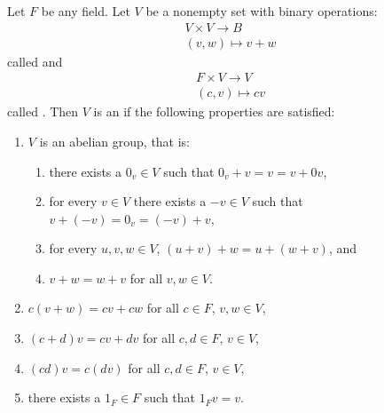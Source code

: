     \begin{definition}
        Let $F$ be any field. Let $V$ be a nonempty set with binary operations:
            \begin{equation*}
            \begin{split}
                V \times V \rightarrow B \\
                (v,w) \mapsto v+w
            \end{split}
            \end{equation*}
        called  and
            \begin{equation*}
            \begin{split}
                F \times V \rightarrow V \\
                (c,v) \mapsto cv
            \end{split}
            \end{equation*}
        called . Then $V$ is an  if the following properties are satisfied:
            \begin{enumerate}[label = (\arabic*)]
                \item $V$ is an abelian group, that is:
                    \begin{enumerate}[label = (\roman*)]
                        \item there exists a $0_v \in V$ such that $0_v + v = v = v + 0v$,
                        \item for every $v \in V$ there exists a $-v \in V$ such that $v+(-v) = 0_v = (-v) + v$,
                        \item for every $u,v,w \in V$, $(u+v) + w = u + (w+v)$, and
                        \item $v + w = w+ v$ for all $v,w \in V$. 
                    \end{enumerate}
                \item $c(v+w) = cv + cw$ for all $c \in F$, $v,w \in V$,
                \item $(c+d)v = cv + dv$ for all $c,d \in F$, $v \in V$,
                \item $(cd)v = c(dv)$ for all $c,d \in F$, $v \in V$,
                \item there exists a $1_F \in F$ such that $1_F v = v$.
            \end{enumerate}
    \end{definition}

